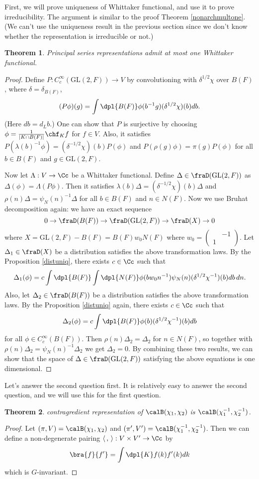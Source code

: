 \documentclass{article}
\newtheorem{theorem}{Theorem}[section]
\newcommand{\GL}{\mathrm{GL}}
\newcommand{\smat}[4]{\left(\begin{smallmatrix} #1 & #2 \\ #3 & #4 \end{smallmatrix}\right)}
\begin{document}
First, we will prove uniqueness of Whittaker functional, and use it to prove irreducibility. The argument is similar to the proof Theorem \ref{nonarchmultone}. 
(We can't use the uniqueness result in the previous section since we don't know whether the representation is irreducible or not.) 

\begin{theorem}
\label{psrepwh}
Principal series representations admit at most one Whittaker functional. 
\end{theorem}
\begin{proof}
Define $P:C^{\infty}_{c}(\GL(2,F))\to V$ by convolutioning with $\delta^{1/2}\chi$ over $B(F)$, where $\delta = \delta_{B(F)}$,
$$
(P\phi)(g) = \int\dpl{B(F)} \phi(b^{-1}g) (\delta^{1/2}\chi)(b)db.
$$
(Here $db = d_{L}b$.) One can show that $P$ is surjective by choosing $\phi = \frac{1}{|K\cap B(F)|}\chf_{K}f$ for $f\in V$. 
Also, it satisfies $P(\lambda(b)^{-1}\phi) = (\delta^{-1/2}\chi)(b)P(\phi)$ and $P(\rho(g)\phi) = \pi(g)P(\phi)$ for all $b\in B(F)$ and $g\in \GL(2, F)$. 

Now let $\Lambda: V\to \Cc$ be a Whittaker functional. Define $\Delta\in \fraD(\GL(2, F))$ as $\Delta(\phi) = \Lambda(P\phi)$. 
Then it satisfies $\lambda(b) \Delta = (\delta^{-1/2}\chi)(b)\Delta$ and $\rho(n)\Delta = \psi_{N}(n)^{-1}\Delta$ for all $b\in B(F)$ and $n\in N(F)$. 
Now we use Bruhat decomposition again: we have an exact sequence 
$$
0\to \fraD(B(F)) \to \fraD(\GL(2, F)) \to \fraD(X) \to 0
$$
where $X = \GL(2, F) -  B(F) = B(F)w_{0}N(F)$ where $w_{0} = \smat{}{-1}{1}{}$. 
Let $\Delta_1\in \fraD(X)$ be a distribution satisfies the above transformation laws. 
By the Proposition \ref{distuniq}, there exists $c\in \Cc$ such that 
$$
\Delta_{1}(\phi) = c\int\dpl{B(F)}\int\dpl{N(F)} \phi(bw_{0}n^{-1})\psi_{N}(n)(\delta^{1/2}\chi^{-1})(b)db\,dn.
$$
Also, let $\Delta_2\in \fraD(B(F))$ be a distribution satisfies the above transformation laws. 
By the Proposition \ref{distuniq} again, there exists $c\in \Cc$ such that
$$
\Delta_2(\phi) = c\int\dpl{B(F)} \phi(b) (\delta^{1/2}\chi^{-1})(b)db
$$
for all $\phi\in C_{c}^{\infty}(B(F))$. 
Then $\rho(n)\Delta_2 = \Delta_2$ for $n\in N(F)$, so together with $\rho(n)\Delta_2 = \psi_{N}(n)^{-1}\Delta_2$ we get $\Delta_2 =0$. 
By combining these two results, we can show that the space of $\Delta\in \fraD(\GL(2, F))$ satisfying the above equations is one dimensional. 
\end{proof}


Let's answer the second question first. It is relatively easy to answer the second question, and we will use this for the first question. 
\begin{theorem}
contragredient representation of $\calB(\chi_1, \chi_2)$ is $\calB(\chi_1^{-1},\chi_2^{-1})$. \end{theorem}
\begin{proof}
Let $(\pi, V) = \calB(\chi_1, \chi_2)$ and $(\pi', V') = \calB(\chi_1^{-1}, \chi_{2}^{-1})$. 
Then we can define a non-degenerate pairing $\langle\,,\,\rangle : V\times V' \to \Cc$ by 
$$
\bra{f}{f'} = \int\dpl{K} f(k)f'(k)dk
$$
which is $G$-invariant. 
\end{proof}
\end{document}
